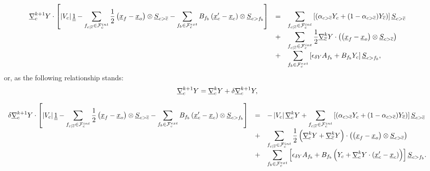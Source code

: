 \begin{equation}\label{eq:gradrc_recontruit_comp2}
\begin{array}{r c l}
\displaystyle
\underline{\nabla}_{c}^{k+1} Y \cdot \left[\left| V_{c} \right| \underline{\underline{1}} -
\sum\limits_{ {{f}_{c|{\overline{c}}}} \in \mathcal{F}^{int}_{c}} \frac{1}{2}  \left(\underline{x}_{{f}} - \underline{x}_o\right) \otimes \underline{S}_{{c > {\overline{c}}}} -
\sum\limits_{ {{f}_{b}} \in \mathcal{F}^{ext}_{c}} B_{{{f}_{b}}} \left(\underline{x}_{c}^\prime - {\underline{x}_{c}}\right)  \otimes \underline{S}_{{c>{{f}_{b}}}}  \right]
&=&
\displaystyle
\sum\limits_{{{f}_{c|{\overline{c}}}} \in \mathcal{F}^{int}_{c}}\left[
(\alpha_{{c > {\overline{c}}}} Y_c + (1 - \alpha_{{c > {\overline{c}}}}) Y_{{\overline{c}}})\right] \underline{S}_{{c > {\overline{c}}}} \\
&+&
\displaystyle
\sum\limits_{{{f}_{c|{\overline{c}}}} \in \mathcal{F}^{int}_{c}} \frac{1}{2} \underline{\nabla}_{{\overline{c}}}^k Y \cdot \left( \left(\underline{x}_{{f}} - \underline{x}_o\right) \otimes \underline{S}_{{c > {\overline{c}}}} \right) \\
&+&
\displaystyle
\sum\limits_{{{f}_{b}} \in \mathcal{F}^{ext}_{c}}\left[ \epsilon_{\delta Y} A_{{{f}_{b}}} + B_{{{f}_{b}}} Y_{c} \right] \underline{S}_{{c>{{f}_{b}}}},
\end{array}
\end{equation}
%
or, as the following relationship stands:
\begin{equation*}
 \underline{\nabla}_c^{k+1} Y = \underline{\nabla}_{c}^k Y+ \delta \underline{\nabla}_{c}^{k+1} Y ,
\end{equation*}

\begin{equation}\label{eq:gradrc_recontruit_increment}
\begin{array}{r c l}
\displaystyle
\delta \underline{\nabla}_{c}^{k+1} Y \cdot \left[\left| V_{c} \right| \underline{\underline{1}} -
\sum\limits_{ {{f}_{c|{\overline{c}}}} \in \mathcal{F}^{int}_{c}} \frac{1}{2}  \left(\underline{x}_{{f}} - \underline{x}_o\right) \otimes \underline{S}_{{c > {\overline{c}}}} -
\sum\limits_{ {{f}_{b}} \in \mathcal{F}^{ext}_{c}} B_{{{f}_{b}}}  \left(\underline{x}_{c}^\prime - {\underline{x}_{c}}\right)  \otimes \underline{S}_{{c>{{f}_{b}}}}  \right]
&=&
\displaystyle
 -\left| V_{c} \right|  \underline{\nabla}_{c}^{k} Y +
\sum\limits_{{{f}_{c|{\overline{c}}}} \in \mathcal{F}^{int}_{c}}\left[
(\alpha_{{c > {\overline{c}}}} Y_{c} + (1 - \alpha_{{c > {\overline{c}}}}) Y_{{\overline{c}}})\right] \underline{S}_{{c > {\overline{c}}}} \\
&+&
\displaystyle
\sum\limits_{{{f}_{c|{\overline{c}}}} \in \mathcal{F}^{int}_{c}} \frac{1}{2}
\left(\underline{\nabla}_{c}^k Y + \underline{\nabla}_{{\overline{c}}}^k Y \right) \cdot \left( \left(\underline{x}_{{f}} - \underline{x}_o\right) \otimes \underline{S}_{{c > {\overline{c}}}} \right) \\
&+&
\displaystyle
\sum\limits_{{{f}_{b}} \in \mathcal{F}^{ext}_{c}}\left[ \epsilon_{\delta Y} A_{{{f}_{b}}}
            + B_{{{f}_{b}}} \left( Y_{c} + \underline{\nabla}_{c}^k Y \cdot \left(\underline{x}_{c}^\prime - {\underline{x}_{c}}\right) \right) \right] \underline{S}_{{c>{{f}_{b}}}}.
\end{array}
\end{equation}

